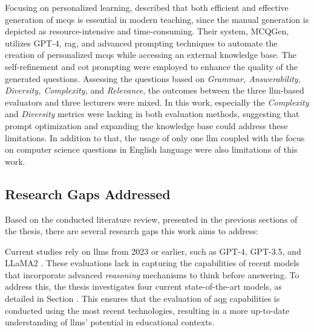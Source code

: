 Focusing on personalized learning, \cite{hang_mcqgen_2024} described that both efficient and effective generation of \ac{mcqs} is essential in modern teaching, since the manual generation is depicted as resource-intensive and time-consuming. Their system, MCQGen, utilizes GPT-4, \ac{rag}, and advanced prompting techniques to automate the creation of personalized \ac{mcqs} while accessing an external knowledge base. The self-refinement and \ac{cot} prompting were employed to enhance the quality of the generated questions. Assessing the questions based on \textit{Grammar, Answerability, Diversity, Complexity,} and \textit{Relevance}, the outcomes between the three \ac{llm}-based evaluators and three lecturers were mixed. In this work, especially the \textit{Complexity} and \textit{Diversity} metrics were lacking in both evaluation methods, suggesting that prompt optimization and expanding the knowledge base could address these limitations. In addition to that, the usage of only one \ac{llm} coupled with the focus on computer science questions in English language were also limitations of this work.

\subsection{Research Gaps Addressed}

Based on the conducted literature review, presented in the previous sections of the thesis, there are several research gaps this work aims to address: 

 Current studies rely on \ac{llms} from 2023 or earlier, such as GPT-4, GPT-3.5, and LLaMA2 \cite{scaria_how_2024, maity_can_2025, al_faraby_analysis_2024}. These evaluations lack in capturing the capabilities of recent models that incorporate advanced \textit{reasoning} mechanisms to think before answering. To address this, the thesis investigates four current state-of-the-art models, as detailed in Section . This ensures that the evaluation of \ac{aqg} capabilities is conducted using the most recent technologies, resulting in a more up-to-date understanding of \ac{llms}' potential in educational contexts.

\pagebreak

